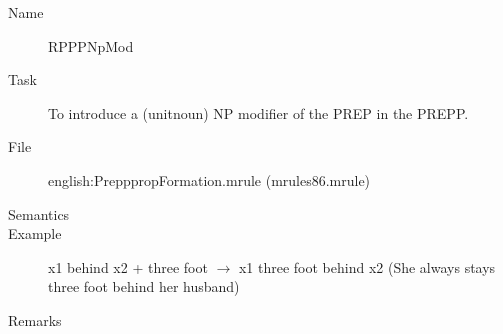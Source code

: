 \begin{description}
\vspace{1 cm}
\begin{description}
\item[Name] RPPPNpMod
\item[Task] To introduce a (unitnoun) NP modifier of the PREP in the PREPP.
\item[File] english:PrepppropFormation.mrule (mrules86.mrule)
\item[Semantics]
\item[Example] x1 behind x2 + three foot $\rightarrow$ x1 three foot behind 
x2 (She always stays three foot behind her husband)
\item[Remarks]
\end{description}

\end{description}




